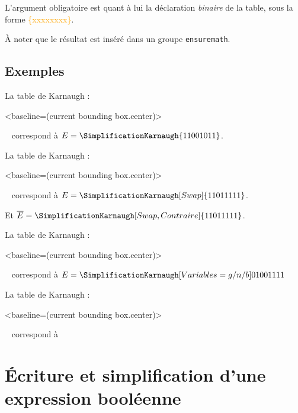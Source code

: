 \documentclass[french,a4paper,11pt]{article}
\newcommand\Cle[1]{{\small\sffamily\textlangle \textcolor{orange}{#1}\textrangle}}
\begin{document}
{{\begin{tipblock}
L'argument obligatoire est quant à lui la déclaration \textit{binaire} de la table, sous la forme \Cle{\{xxxxxxxx\}}.

\smallskip

À noter que le résultat est inséré dans un groupe \texttt{ensuremath}.
\end{tipblock}

\subsection{Exemples}

\begin{DemoCode}
La table de Karnaugh :
\begin{TableKarnaugh}<baseline=(current bounding box.center)>
\end{TableKarnaugh}~
correspond à $E=\SimplificationKarnaugh{11001011}$.
\end{DemoCode}

\begin{DemoCode}
La table de Karnaugh :
\begin{TableKarnaugh}[Swap]<baseline=(current bounding box.center)>
\end{TableKarnaugh}~
correspond à $E=\SimplificationKarnaugh[Swap]{11011111}$.

Et $\overline{E}=\SimplificationKarnaugh[Swap,Contraire]{11011111}$.
\end{DemoCode}

\begin{DemoCode}
La table de Karnaugh :
\begin{TableKarnaugh}[Variables={g/n/b}]<baseline=(current bounding box.center)>
\end{TableKarnaugh}~
correspond à $E=\SimplificationKarnaugh[Variables={g/n/b}]{01001111}$
\end{DemoCode}

\begin{DemoCode}
La table de Karnaugh :
\begin{TableKarnaugh}[StyleAlternatif]<baseline=(current bounding box.center)>
\end{TableKarnaugh}~
correspond à 
\end{DemoCode}

\pagebreak

\section{Écriture et simplification d'une expression booléenne}

}}
\end{document}
